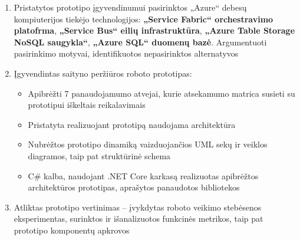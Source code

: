 \begin{enumerate}
    
    \item Pristatytos prototipo įgyvendinumui pasirinktos „Azure“ debesų kompiuterijos tiekėjo technologijos: \textbf{„Service Fabric“ orchestravimo platofrma}, \textbf{„Service Bus“ eilių infrastruktūra}, \textbf{„Azure Table Storage NoSQL saugykla“}, \textbf{„Azure SQL“ duomenų bazė}. Argumentuoti pasirinkimo motyvai, identifikuotos nepasirinktos alternatyvos
    
    \item Įgyvendintas saityno peržiūros roboto prototipas:
    \begin{itemize}
        \item Apibrėžti 7 panaudojamumo atvejai, kurie atsekamumo matrica susieti su prototipui iškeltais reikalavimais
        \item Pristatyta realizuojant prototipą naudojama architektūra
        \item Nubrėžtos prototipo dinamiką vaizduojančios UML sekų ir veiklos diagramos, taip pat struktūrinė schema
        \item C\# kalba, naudojant .NET Core karkasą realizuotas apibrėžtos architektūros prototipas, aprašytos panaudotos bibliotekos
    \end{itemize}
    
    
    \item Atliktas prototipo vertinimas -- įvykdytas roboto veikimo stebėsenos eksperimentas, surinktos ir išanalizuotos funkcinės metrikos, taip pat prototipo komponentų apkrovos
\end{enumerate}
